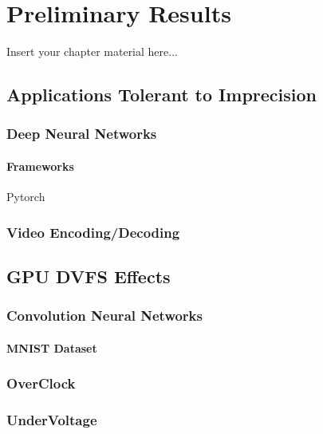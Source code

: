 
\chapter{Preliminary Results}
\label{chapter:preliminaryresults}

Insert your chapter material here...

\section{Applications Tolerant to Imprecision}
\label{section:api}

\subsection{Deep Neural Networks}

\subsubsection{Frameworks}
Pytorch

\subsection{Video Encoding/Decoding}

\section{GPU DVFS Effects}
\label{section:solarch}

\subsection{Convolution Neural Networks}
\subsubsection{MNIST Dataset}

\subsection{OverClock}
\label{section:underclock}

\subsection{UnderVoltage}




